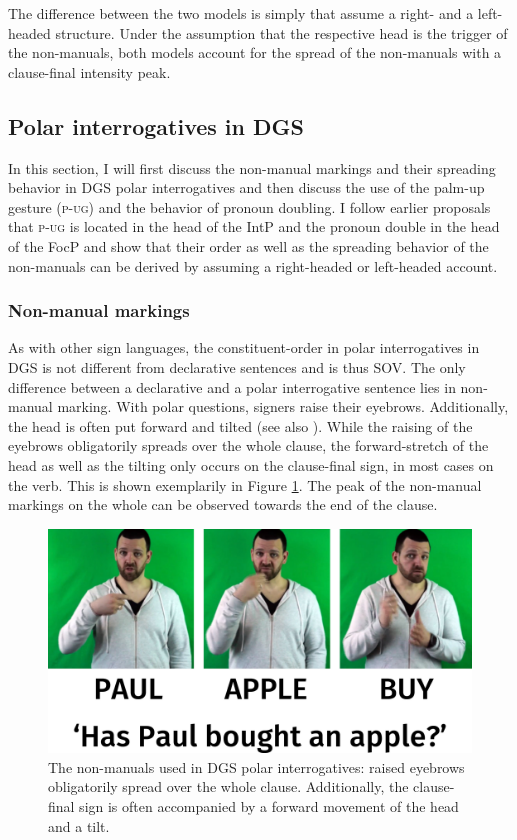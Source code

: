 The difference between the two models is simply that \citet{sarac2006interrogative} assume a right- and \citet{aboh2010sa} a left-headed structure. Under the assumption that the respective head is the trigger of the non-manuals, both models account for the spread of the non-manuals with a clause-final intensity peak.

\subsection{Polar interrogatives in DGS}\label{polarinterrogativesdgs}
In this section, I will first discuss the non-manual markings and their spreading behavior in DGS polar interrogatives and then discuss the use of the palm-up gesture (\textsc{p-ug}) and the behavior of pronoun doubling. I follow earlier proposals that \textsc{p-ug} is located in the head of the IntP \citep{aboh2010sa} and the pronoun double in the head of the FocP \citep{de1999phrase} and show that their order as well as the spreading behavior of the non-manuals can be derived by assuming a right-headed or left-headed account.

\subsubsection{Non-manual markings}
As with other sign languages, the constituent-order in polar interrogatives in DGS is not different from declarative sentences and is thus SOV. The only difference between a declarative and a polar interrogative sentence lies in non-manual marking. With polar questions, signers raise their eyebrows. Additionally, the head is often put forward and tilted (see also \citealt[171--172]{papaspyrou2008grammatik}). While the raising of the eyebrows obligatorily spreads over the whole clause, the forward-stretch of the head as well as the tilting only occurs on the clause-final sign, in most cases on the verb. This is shown exemplarily in Figure \ref{fig:polarint}. The peak of the non-manual markings on the whole can be observed towards the end of the clause.

\begin{figure}[bt]
\centering
	\includegraphics[width=1.0\textwidth]{yesnoquestion.jpg}
	\caption{The non-manuals used in DGS polar interrogatives: raised eyebrows obligatorily spread over the whole clause. Additionally, the clause-final sign is often accompanied by a forward movement of the head and a tilt.}
	\label{fig:polarint}
\end{figure}

